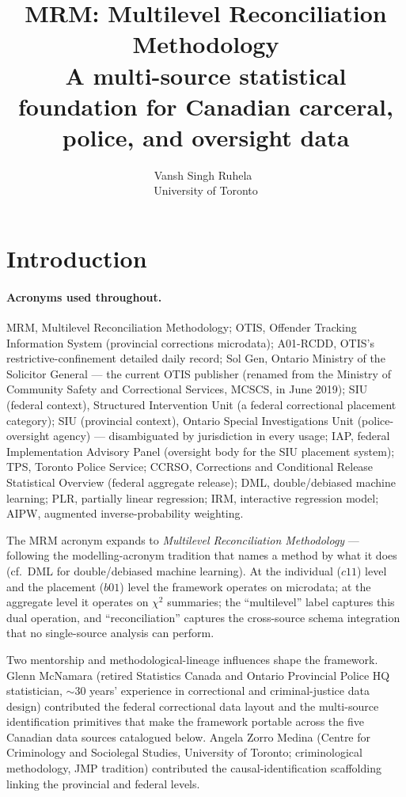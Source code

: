 \documentclass[article,shortnames,nojss]{jss}
\title{MRM: Multilevel Reconciliation Methodology \\ \large A multi-source statistical foundation for Canadian carceral, police, and oversight data}
\author{Vansh Singh Ruhela~\orcidlink{0009-0004-1750-3592}\\University of Toronto}
\begin{document}
\sloppy

\section{Introduction}
\label{sec:intro}

\paragraph*{Acronyms used throughout.}
MRM, Multilevel Reconciliation Methodology;
OTIS, Offender Tracking Information System (provincial corrections microdata);
A01-RCDD, OTIS's restrictive-confinement detailed daily record;
Sol Gen, Ontario Ministry of the Solicitor General --- the current OTIS publisher (renamed from the Ministry of Community Safety and Correctional Services, MCSCS, in June 2019);
SIU (federal context), Structured Intervention Unit (a federal correctional placement category);
SIU (provincial context), Ontario Special Investigations Unit (police-oversight agency) --- disambiguated by jurisdiction in every usage;
IAP, federal Implementation Advisory Panel (oversight body for the SIU placement system);
TPS, Toronto Police Service;
CCRSO, Corrections and Conditional Release Statistical Overview (federal aggregate release);
DML, double/debiased machine learning;
PLR, partially linear regression;
IRM, interactive regression model;
AIPW, augmented inverse-probability weighting.

The MRM acronym expands to \emph{Multilevel Reconciliation
Methodology} --- following the modelling-acronym tradition that
names a method by what it does (cf.\ DML for double/debiased
machine learning).  At the individual ($c11$) level and the
placement ($b01$) level the framework operates on microdata; at
the aggregate level it operates on $\chi^{2}$ summaries; the
``multilevel'' label captures this dual operation, and
``reconciliation'' captures the cross-source schema integration
that no single-source analysis can perform.

Two mentorship and methodological-lineage influences shape the
framework.  Glenn McNamara (retired Statistics Canada and Ontario
Provincial Police HQ statistician, $\sim 30$ years' experience in
correctional and criminal-justice data design) contributed the
federal correctional data layout and the multi-source
identification primitives that make the framework portable across
the five Canadian data sources catalogued below.  Angela Zorro
Medina (Centre for Criminology and Sociolegal Studies,
University of Toronto; criminological methodology, JMP tradition)
contributed the
causal-identification scaffolding linking the provincial and
federal levels.
\end{document}
